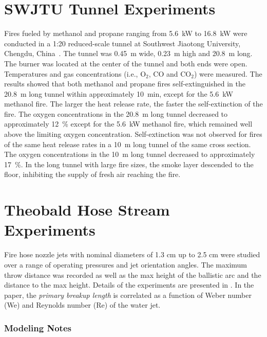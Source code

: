 \FloatBarrier


\section{SWJTU Tunnel Experiments}
\label{SSJTU_Tunnel_Description}

Fires fueled by methanol and propane ranging from 5.6~kW to 16.8~kW were conducted in a 1:20 reduced-scale tunnel at Southwest Jiaotong University, Chengdu, China~\cite{Wang:TUST2019}. The tunnel was 0.45~m wide, 0.23~m high and 20.8~m long. The burner was located at the center of the tunnel and both ends were open. Temperatures and gas concentrations (i.e., O$_2$, CO and CO$_2$) were measured. The results showed that both methanol and propane fires self-extinguished in the 20.8~m long tunnel within approximately 10~min, except for the 5.6~kW methanol fire. The larger the heat release rate, the faster the self-extinction of the fire. The oxygen concentrations in the 20.8~m long tunnel decreased to approximately 12~\% except for the 5.6~kW methanol fire, which remained well above the limiting oxygen concentration.  Self-extinction was not observed for fires of the same heat release rates in a 10~m long tunnel of the same cross section. The oxygen concentrations in the 10~m long tunnel decreased to approximately 17~\%.  In the long tunnel with large fire sizes, the smoke layer descended to the floor, inhibiting the supply of fresh air reaching the fire.


\section{Theobald Hose Stream Experiments}
\label{Theobald_Description}

Fire hose nozzle jets with nominal diameters of 1.3 cm up to 2.5 cm were studied over a range of operating pressures and jet orientation angles.  The maximum throw distance was recorded as well as the max height of the ballistic arc and the distance to the max height.  Details of the experiments are presented in \cite{Theobald:1981}.  In the paper, the \emph{primary breakup length} is correlated as a function of Weber number (We) and Reynolds number (Re) of the water jet.

\subsubsection{Modeling Notes}

